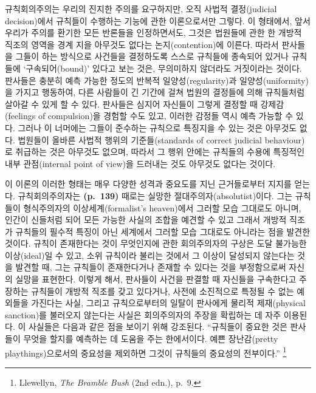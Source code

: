 규칙회의주의는 우리의 진지한 주의를 요구하지만, 오직 사법적
결정(judicial decision)에서 규칙들이 수행하는 기능에 관한 이론으로서만
그렇다. 이 형태에서, 앞서 우리가 주의를 환기한 모든 반론들을
인정하면서도, 그것은 법원들에 관한 한 개방적 직조의 영역을 경계 지을
아무것도 없다는 논지(contention)에 이른다. 따라서 판사들을 그들이 하는
방식으로 사건들을 결정하도록 스스로 규칙들에 종속되어 있거나 규칙들에
‘구속되어(bound)’ 있다고 보는 것은, 무의미하지 않더라도 거짓이라는
것이다. 판사들은 충분히 예측 가능한 정도의 반복적 일양성(regularity)과
일양성(uniformity)을 가지고 행동하여, 다른 사람들이 긴 기간에 걸쳐
법원의 결정들에 의해 규칙들처럼 살아갈 수 있게 할 수 있다. 판사들은
심지어 자신들이 그렇게 결정할 때 강제감(feelings of compulsion)을 경험할
수도 있고, 이러한 감정들 역시 예측 가능할 수 있다. 그러나 이 너머에는
그들이 준수하는 규칙으로 특징지을 수 있는 것은 아무것도 없다. 법원들이
올바른 사법적 행위의 기준들(standards of correct judicial behaviour)로
취급하는 것은 아무것도 없으며, 따라서 그 행위 안에는 규칙들의 수용에
특징적인 내부 관점(internal point of view)을 드러내는 것도 아무것도
없다는 것이다.

이 이론의 이러한 형태는 매우 다양한 성격과 중요도를 지닌 근거들로부터
지지를 얻는다. 규칙회의주의자는 \textbf{(p.~139)} 때로는 실망한
절대주의자(absolutist)이다. 그는 규칙들이 형식주의자의
이상세계(formalist's heaven)에서 그러할 모습 그대로도 아니며, 인간이
신들처럼 되어 모든 가능한 사실의 조합을 예견할 수 있고 그래서 개방적
직조가 규칙들의 필수적 특징이 아닌 세계에서 그러할 모습 그대로도
아니라는 점을 발견한 것이다. 규칙이 존재한다는 것이 무엇인지에 관한
회의주의자의 구상은 도달 불가능한 이상(ideal)일 수 있고, 소위 규칙이라
불리는 것에서 그 이상이 달성되지 않는다는 것을 발견할 때, 그는 규칙들이
존재한다거나 존재할 수 있다는 것을 부정함으로써 자신의 실망을 표현한다.
이렇게 해서, 판사들이 사건을 판결할 때 자신들을 구속한다고 주장하는
규칙들이 개방적 직조를 갖고 있다거나, 사전에 소진적으로 특정될 수 없는
예외들을 가진다는 사실, 그리고 규칙으로부터의 일탈이 판사에게 물리적
제재(physical sanction)를 불러오지 않는다는 사실은 회의주의자의 주장을
확립하는 데 자주 이용된다. 이 사실들은 다음과 같은 점을 보이기 위해
강조된다. “규칙들이 중요한 것은 판사들이 무엇을 할지를 예측하는 데
도움을 주는 한에서이다. 예쁜 장난감(pretty playthings)으로서의 중요성을
제외하면 그것이 규칙들의 중요성의 전부이다.” \footnote{Llewellyn,
  \emph{The Bramble Bush} (2nd edn.), p.~9.}


